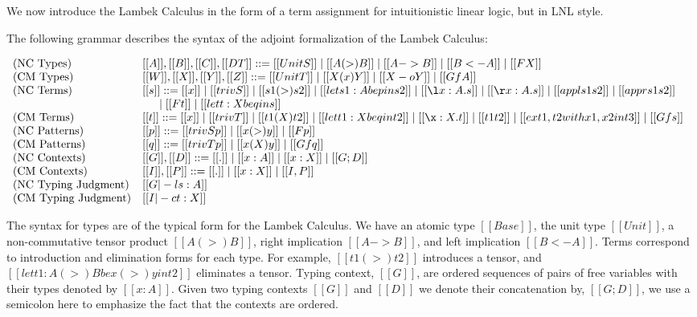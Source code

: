 We now introduce the Lambek Calculus in the form of a term assignment
for intuitionistic linear logic, but in LNL style.
\begin{definition}
  \label{def:Lambek-syntax}
  The following grammar describes the syntax of the adjoint
  formalization of the Lambek Calculus:
  \begin{center}\vspace{-10px}
    \begin{math}
      \begin{array}{lll}
        \text{(NC Types)} & [[A]],[[B]],[[C]],[[DT]] ::= [[UnitS]] \mid [[A (>) B]] \mid [[A -> B]] \mid [[B <- A]] \mid [[F X]]\\
        \text{(CM Types)} & [[W]],[[X]],[[Y]],[[Z]] ::= [[UnitT]] \mid [[X (x) Y]] \mid [[X -o Y]] \mid [[Gf A]]\\
        \text{(NC Terms)} & [[s]] ::= [[x]] \mid [[trivS]] \mid [[s1 (>) s2]] \mid [[let s1 : A be p in s2]] \mid [[\l x : A.s]] \mid [[\r x : A . s]] \mid [[appl s1 s2]] \mid [[appr s1 s2]] \\
        & \,\,\,\,\,\,\,\,\,\mid [[F t]] \mid [[let t : X be q in s]]\\
        \text{(CM Terms)} & [[t]] ::= [[x]] \mid [[trivT]] \mid [[t1 (X) t2]] \mid [[let t1 : X be q in t2]] \mid [[\x:X.t]] \mid [[t1 t2]] \mid [[ex t1 , t2 with x1 , x2 in t3]] \mid [[Gf s]]\\
        \text{(NC Patterns)} & [[p]] ::= [[trivSp]] \mid [[x (>) y]] \mid [[F p]]\\
        \text{(CM Patterns)} & [[q]] ::= [[trivTp]] \mid [[x (X) y]] \mid [[Gf q]]\\
        \text{(NC Contexts)} & [[G]],[[D]] ::= [[.]] \mid [[x : A]] \mid [[x : X]] \mid [[G;D]]\\
        \text{(CM Contexts)} & [[I]],[[P]] ::= [[.]] \mid [[x : X]] \mid [[I,P]]\\
        \text{(NC Typing Judgment)} & [[G |-l s : A]]\\
        \text{(CM Typing Judgment)} & [[I |-c t : X]]\\
      \end{array}
    \end{math}
  \end{center}
\end{definition}

The syntax for types are of the typical form for the Lambek Calculus.
We have an atomic type $[[Base]]$, the unit type $[[Unit]]$, a
non-commutative tensor product $[[A (>) B]]$, right implication $[[A
    -> B]]$, and left implication $[[B <- A]]$.  Terms correspond to
introduction and elimination forms for each type.  For example, $[[t1
    (>) t2]]$ introduces a tensor, and $[[let t1 : A (>) B be x (>) y
    in t2]]$ eliminates a tensor.  Typing context, $[[G]]$, are
ordered sequences of pairs of free variables with their types denoted
by $[[x : A]]$.  Given two typing contexts $[[G]]$ and $[[D]]$ we
denote their concatenation by, $[[G;D]]$, we use a semicolon here to
emphasize the fact that the contexts are ordered.

